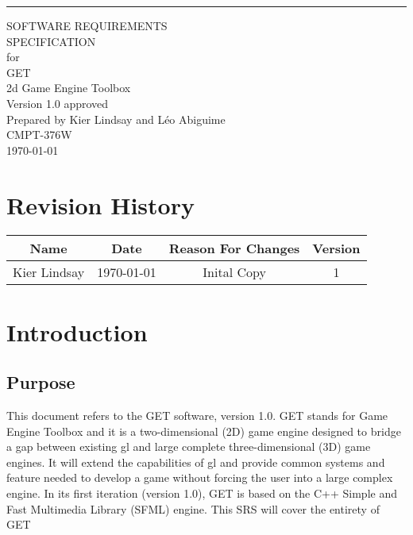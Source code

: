 \documentclass{scrreprt}
\date{}
\def\myversion{1.0 }
\begin{document}
\begin{flushright}
    \rule{16cm}{5pt}\vskip1cm
    \begin{bfseries}
        \Huge{SOFTWARE REQUIREMENTS\\ SPECIFICATION}\\
        \vspace{1.9cm}
        for\\
        \vspace{1.9cm}
        GET\\
        2d Game Engine Toolbox\\
        \vspace{1.9cm}
        \LARGE{Version \myversion approved}\\
        \vspace{1.9cm}
        Prepared by Kier Lindsay and Léo Abiguime\\
        \vspace{1.9cm}
        CMPT-376W\\
        \vspace{1.9cm}
        \today\\
    \end{bfseries}
\end{flushright}

\tableofcontents


\chapter*{Revision History}

\begin{center}
    \begin{tabular}{|c|c|c|c|}
        \hline
	    Name & Date & Reason For Changes & Version\\
        \hline
	    Kier Lindsay & \today & Inital Copy & 1\\
        \hline
    \end{tabular}
\end{center}

\chapter{Introduction}

\section{Purpose}
This document refers to the GET software, version 1.0. GET stands for Game Engine Toolbox and it is a two-dimensional (2D) game engine designed to bridge a gap between existing \gls{gl} and large complete three-dimensional (3D) game engines.  It will extend the capabilities of \gls{gl} and provide common systems and feature needed to develop a game without forcing the user into a large complex engine. In its first iteration (version 1.0), GET is based on the C++ Simple and Fast Multimedia Library (SFML) engine. This SRS will cover the entirety of GET
\end{document}
